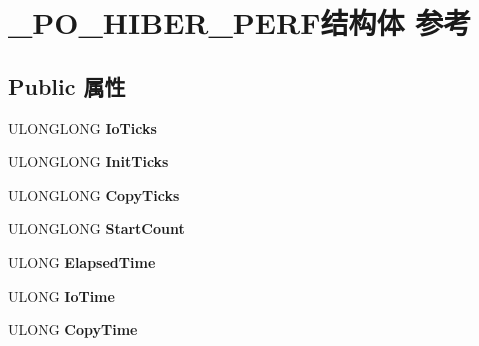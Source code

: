 \hypertarget{struct___p_o___h_i_b_e_r___p_e_r_f}{}\section{\+\_\+\+P\+O\+\_\+\+H\+I\+B\+E\+R\+\_\+\+P\+E\+R\+F结构体 参考}
\label{struct___p_o___h_i_b_e_r___p_e_r_f}
\subsection*{Public 属性}
\begin{DoxyCompactItemize}
\item 
\mbox{\label{struct___p_o___h_i_b_e_r___p_e_r_f_a865ea7ae63047d00353561c8d3161224}} 
U\+L\+O\+N\+G\+L\+O\+NG {\bfseries Io\+Ticks}
\item 
\mbox{\label{struct___p_o___h_i_b_e_r___p_e_r_f_a4ad3f736ff5691922bc0305978e256d7}} 
U\+L\+O\+N\+G\+L\+O\+NG {\bfseries Init\+Ticks}
\item 
\mbox{\label{struct___p_o___h_i_b_e_r___p_e_r_f_a515b4ac94c73abdd0a5707d27e2f6cdc}} 
U\+L\+O\+N\+G\+L\+O\+NG {\bfseries Copy\+Ticks}
\item 
\mbox{\label{struct___p_o___h_i_b_e_r___p_e_r_f_a1bd77bcc3b792e4a677f4d90c58115a0}} 
U\+L\+O\+N\+G\+L\+O\+NG {\bfseries Start\+Count}
\item 
\mbox{\label{struct___p_o___h_i_b_e_r___p_e_r_f_aeebbf1dfb9be587e075e8206eca29798}} 
U\+L\+O\+NG {\bfseries Elapsed\+Time}
\item 
\mbox{\label{struct___p_o___h_i_b_e_r___p_e_r_f_a6cc17c0e47bca835ae48270686bda3ef}} 
U\+L\+O\+NG {\bfseries Io\+Time}
\item 
\mbox{\label{struct___p_o___h_i_b_e_r___p_e_r_f_a38dd61c121bae66bb7d5e8f41bd14ff2}} 
U\+L\+O\+NG {\bfseries Copy\+Time}
\item 
\mbox{\label{struct___p_o___h_i_b_e_r___p_e_r_f_a799d6752671a1fe2f0b05aa8317bb7f0}} 

\end{DoxyCompactItemize}

